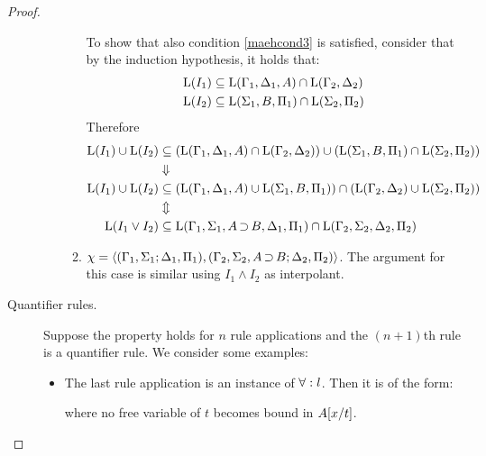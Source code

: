 \begin{proof}
\begin{description}
\begin{itemize}
\begin{enumerate}
							{


								To show that also condition \ref{maehcond3} is satisfied, consider that by the induction hypothesis, it holds that:
								\begin{align*}
									\operatorname{L}(I_1) &\subseteq \operatorname{L}(\Gamma_1, \Delta_1, A) \cap \operatorname{L}(\Gamma_2, \Delta_2) \\
									\operatorname{L}(I_2) &\subseteq \operatorname{L}(\Sigma_1, B, \Pi_1) \cap \operatorname{L}(\Sigma_2, \Pi_2)
								\end{align*}\nopagebreak
								Therefore
								\begin{align*}
									\operatorname{L}(I_1) \cup \operatorname{L}(I_2) &\subseteq
									(\operatorname{L}(\Gamma_1, \Delta_1, A) \cap \operatorname{L}(\Gamma_2, \Delta_2)) \cup ( \operatorname{L}(\Sigma_1, B, \Pi_1) \cap \operatorname{L}(\Sigma_2, \Pi_2))  \\
									&\Downarrow \\
									\operatorname{L}(I_1) \cup \operatorname{L}(I_2) &\subseteq
									(\operatorname{L}(\Gamma_1, \Delta_1, A) \cup \operatorname{L}(\Sigma_1, B, \Pi_1)) \cap (\operatorname{L}(\Gamma_2, \Delta_2) \cup \operatorname{L}(\Sigma_2, \Pi_2)) \\
									&\Updownarrow \\
									\operatorname{L}(I_1 \lor I_2) &\subseteq \operatorname{L}(\Gamma_1, \Sigma_1, A\operatorname{\supset} B, \Delta_1, \Pi_1) \cap \operatorname{L}(\Gamma_2, \Sigma_2, \Delta_2, \Pi_2)
								\end{align*}

							}

						\item $\chi =  \langle (\Gamma_1, \Sigma_1; \Delta_1, \Pi_1), (\Gamma_2, \Sigma_2, A\operatorname{\supset} B; \Delta_2, \Pi_2)\rangle $.
							The argument for this case is similar using $I_1 \land I_2$ as interpolant.
					\end{enumerate}

			\end{itemize}

		\item[\normalfont Quantifier rules.]
			Suppose the property holds for $n$ rule applications and the $(n+1)$th rule is a quantifier rule.
			We consider some examples:

			\begin{itemize}
				\item The last rule application is an instance of $\forall:l$. Then it is of the form:
					\begin{prooftree}
					\end{prooftree}
					where no free variable of $t$ becomes bound in $A[x/t]$.


\end{itemize}
\end{description}
\end{proof}
